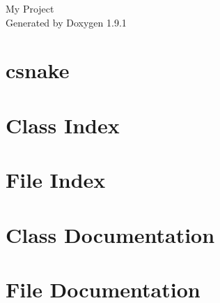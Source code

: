 \let\mypdfximage\pdfximage\def\pdfximage{\immediate\mypdfximage}\documentclass[twoside]{book}
\newcommand{\+}{\discretionary{\mbox{\scriptsize$\hookleftarrow$}}{}{}}
\newcommand{\clearemptydoublepage}{%
  \newpage{\pagestyle{empty}\cleardoublepage}%
}
\begin{document}
\raggedbottom

\hypersetup{pageanchor=false,
             bookmarksnumbered=true,
             pdfencoding=unicode
            }
\begin{titlepage}
\vspace*{7cm}
\begin{center}%
{\Large My Project }\\
\vspace*{1cm}
{\large Generated by Doxygen 1.9.1}\\
\end{center}
\end{titlepage}
\clearemptydoublepage
{}
\tableofcontents
\clearemptydoublepage
{}
\hypersetup{pageanchor=true}

\chapter{csnake}
\label{md_README}

\chapter{Class Index}

\chapter{File Index}

\chapter{Class Documentation}











\chapter{File Documentation}

















\backmatter
\newpage
{}
\clearemptydoublepage
{}
\printindex
\end{document}
